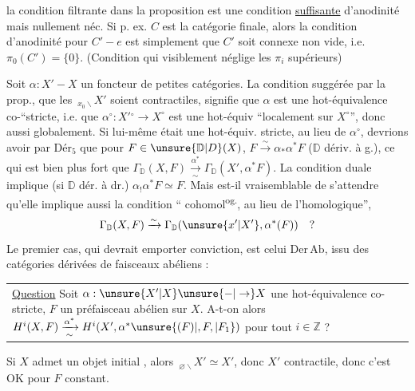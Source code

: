 la condition  filtrante dans la proposition  est  une condition \uline{suffisante} d'anodinité mais nullement néc. Si p. ex. $C$ est la catégorie finale, alors la condition d'anodinité pour $C'-e$ est simplement que $C'$ soit connexe non vide,  i.e. $\pi_0(C')=\{0\}$. (Condition qui visiblement néglige les $\pi_i$ supérieurs)

Soit $\boxed{\alpha:X'-X}$ un foncteur de petites catégories. La condition suggérée par la prop., que les $\,{}_{x_0\backslash}X'$ soient contractiles, signifie que $\alpha$ est une hot-équivalence co-``stricte, i.e. que $\alpha^\circ:X'{}^\circ\to X^\circ$ est une hot-équiv ``localement sur $X^\circ$'', donc aussi globalement. Si \deleted{\unsure{$\alpha$}}
lui-même était une hot-équiv. stricte, au lieu de $\alpha^\circ$, devrions avoir par $\mathrm{Dér}_5$ que pour $F\in\unsure{\mathbb D|D}(X)$, $F\xrightarrow{\sim}\alpha_*\alpha^*F$ ($\mathbb D$ dériv. à g.), ce qui est bien plus fort que $\Gamma_{\mathbb D}(X,F)\xrightarrow[\sim]{\alpha^*}\Gamma_{\mathbb D}(X',\alpha^*F)$.  La condition duale implique (si $\mathbb D$ dér. à dr.) $\alpha_!\alpha^*F\simeq F$. Mais est-il vraisemblable de s'attendre qu'elle implique aussi la condition ``  cohomol\textsuperscript{og.}, au lieu de l'homologique'',
\[
 \Gamma_{\mathbb D}(X,F)\xrightarrow{\sim}\Gamma_{\mathbb D}(\unsure{x'|X'},\alpha^*(F))\quad ?
\]
Le premier cas, qui devrait emporter conviction, est celui    $\mathrm{Der\,Ab}$, issu des catégories dérivées de faisceaux abéliens :

\noindent\begin{tabular}{||p{.89\linewidth}}
\uline{Question} Soit $\alpha:\unsure{X'|X}\unsure{-|\to}X$ une hot-équivalence co-stricte, $F$ un préfaisceau abélien sur $X$. A-t-on alors $H^i(X,F)\xrightarrow[\sim]{\alpha^*}H^i(X',\alpha^*\unsure{(F)|,F,|F_1})$ pour tout $i\in\mathbb Z$ ?
\end{tabular}

Si $X$ admet un objet  initial \inserted{$\varnothing$}, alors $\,{}_{\varnothing\backslash}X'\simeq X'$, donc $X'$ contractile, donc c'est OK pour $F$ constant.


